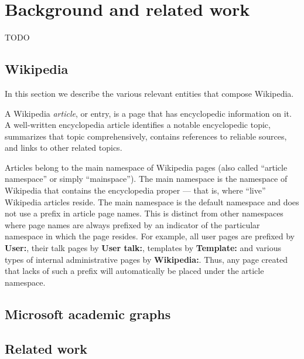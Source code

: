 
\chapter{Background and related work}
\label{cha:background}
TODO


\section{Wikipedia}
\label{sec:wikistructure}
In this section we describe the various relevant entities that compose Wikipedia.

A Wikipedia \emph{article}, or entry, is a page that has encyclopedic information on it.
A well-written encyclopedia article identifies a notable encyclopedic topic, summarizes that topic comprehensively, contains references to reliable sources, and links to other related topics.

Articles belong to the main namespace of Wikipedia pages (also called ``article namespace'' or simply ``mainspace'').
The main namespace is the namespace of Wikipedia that contains the encyclopedia proper — that is, where ``live'' Wikipedia articles reside.
The main namespace is the default namespace and does not use a prefix in article page names.
This is distinct from other namespaces where page names are always prefixed by an indicator of the particular namespace in which the page resides.
For example, all user pages are prefixed by \textbf{User:}, their talk pages by \textbf{User talk:}, templates by \textbf{Template:} and various types of internal administrative pages by \textbf{Wikipedia:}.
Thus, any page created that lacks of such a prefix will automatically be placed under the article namespace.

\section{Microsoft academic graphs}
\label{sec:mag}


\section{Related work}
\label{sec:relatedwork}
